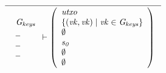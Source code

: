 \begin{figure}
  \begin{equation}
    \label{eq:rule:chain-base}
    \inference
    {}
    {{\begin{array}{l}
         \Gkeys\\
         \wcard\\
         \wcard\\
         \wcard
      \end{array}}
      \vdash
      \left(
        \begin{array}{l}
          \var{utxo}\\
          \var{\{ (\var{vk}, \var{vk}) \mid \var{vk} \in \Gkeys\}}\\
          \emptyset\\
          \var{s_0}\\
          \emptyset\\
          \emptyset
        \end{array}
      \right)
    }
  \end{equation}


\end{figure}
